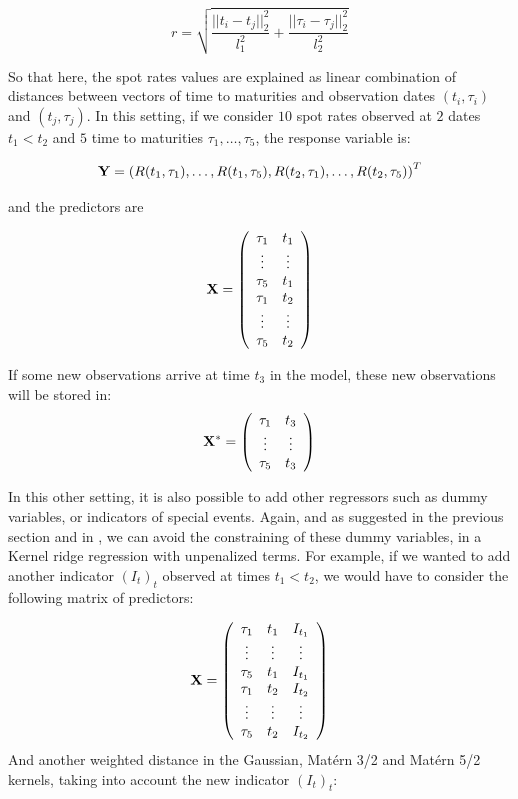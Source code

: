 $$
r = \sqrt{\frac{||t_i - t_j||^2_2}{l_1^2} + \frac{||\tau_i - \tau_j||^2_2}{l_2^2}}
$$

So that here, the spot rates values are explained as linear combination of distances between vectors of  time to maturities and observation dates $(t_i, \tau_i)$ and $(t_j, \tau_j)$. In this setting, if we consider $10$ spot rates observed at $2$ dates $t_1 < t_2$ and $5$ time to maturities $\tau_1, \ldots, \tau_5$, the response variable is:

$$
{\bf Y} = \left(R(t_1, \tau_1), \ldots, R(t_1, \tau_5), R(t_2, \tau_1), \ldots, R(t_2, \tau_5)\right)^T
$$

and the predictors are 

$$
{\bf X} = \left( {\begin{array}{cc} \tau_1 &  t_1\\
                          \vdots & \vdots\\
                          \tau_5 &  t_1\\
                          \tau_1 &  t_2\\
                          \vdots & \vdots\\
                          \tau_5 &  t_2\\
       \end{array} } \right)
$$

If some new observations arrive at time $t_3$ in the model, these new observations will be stored in: 
$$
{\bf X}^* = \left( {\begin{array}{cc} \tau_1 &  t_3\\
                          \vdots & \vdots\\
                          \tau_5 &  t_3\\
       \end{array} } \right)
$$

In this other setting, it is also possible to add other regressors  such as dummy variables, or indicators of special events. Again, and as suggested in the previous section and in \cite{exterkate2016nonlinear}, we can avoid the constraining of these dummy variables, in a Kernel ridge regression with unpenalized terms. For example, if we wanted to add another indicator $(I_t)_t$ observed at times $t_1 < t_2$, we would have to consider the following matrix of predictors:

$$
{\bf X} = \left( {\begin{array}{ccc}
                \tau_1 &  t_1   & I_{t_1}\\
                \vdots & \vdots & \vdots\\
                \tau_5 &  t_1   & I_{t_1}\\
                \tau_1 &  t_2   & I_{t_2}\\
                \vdots & \vdots & \vdots\\
                \tau_5 &  t_2   & I_{t_2}\\
               \end{array} } \right)
$$
And another weighted distance in the Gaussian, Mat\'ern 3/2 and Mat\'ern 5/2 kernels, taking into account the new indicator $(I_t)_t$:

